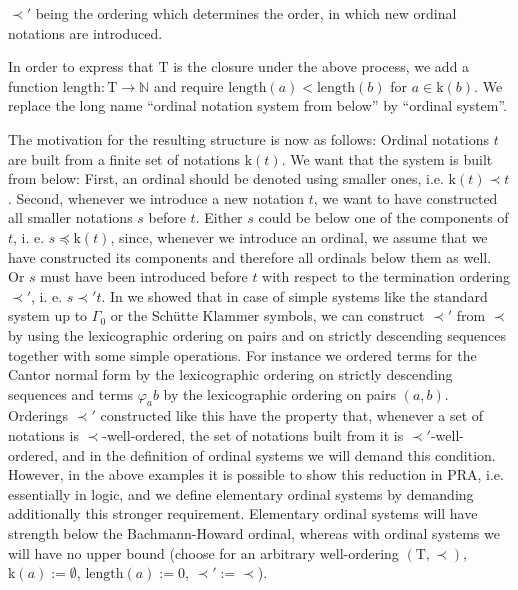 \documentclass[10pt]{article}
\def\ar{\rightarrow}
\def\nat{\mathbb{N}}
\def\length{\mathrm{length}}
\def\k{\mathrm{k}}
\def\T{\mathrm{T}}
\def\PRA{\mathrm{PRA}}
\begin{document}
$\prec '$ being the ordering which determines the  order, in which new
ordinal notations are introduced.\par 
In order to express that $\T$ is the closure under the above process, we
add a function $\length: \T \ar \nat$ and require
$\length(a) < \length(b)$ for $a \in \k(b)$. We replace the long
name ``ordinal notation system from below'' by ``ordinal system''.\par 
The motivation for the resulting structure is now as follows: Ordinal notations
$t$ are built from a finite set of notations $\k(t)$. We want
that the system is built from below: First,
an ordinal should be
denoted using smaller ones, i.e. $\k(t) \prec t$. Second, whenever
we introduce a new notation $t$, we want to have constructed all smaller 
notations $s$ before  $t$. Either $s$ could
be below one of the components of $t$, i. e. $s \preceq \k(t)$, since, whenever
we introduce an ordinal, we assume that we have constructed its
components and therefore all  ordinals below them as well. 
Or $s$ must have been introduced before $t$ with respect to the
termination ordering $\prec'$, 
i. e. $s \prec ' t$.  In \cite{setzvenedig} we showed 
that in case of simple systems like
the standard system up to $\Gamma_0$ or the Sch{\"u}tte Klammer symbols,
we can construct $\prec'$ from $\prec$ by using the lexicographic ordering on 
pairs and on strictly descending sequences together with some simple operations.
For instance we ordered terms for the Cantor normal form by
the lexicographic ordering on strictly descending sequences and terms
$\varphi_ab$ by the lexicographic ordering on pairs $(a,b)$.
Orderings $\prec'$ constructed like this have the property that, whenever a 
set of notations is $\prec$-well-ordered, the set of notations
built from it is $\prec'$-well-ordered, and in the definition
of ordinal systems we will demand this condition.
However, in the above examples it is possible to show 
this reduction in $\PRA$, i.e. essentially in logic, 
and we define elementary
ordinal systems by demanding additionally this stronger 
requirement. Elementary ordinal systems will
have strength below the Bachmann-Howard ordinal, whereas with ordinal
systems we  will have no upper bound (choose for an arbitrary
well-ordering $(\T,\prec)$, $\k(a) := \emptyset$, $\length(a):= 0$,
$\prec':= \prec$).
%
%
%
%
%
%
\end{document}
